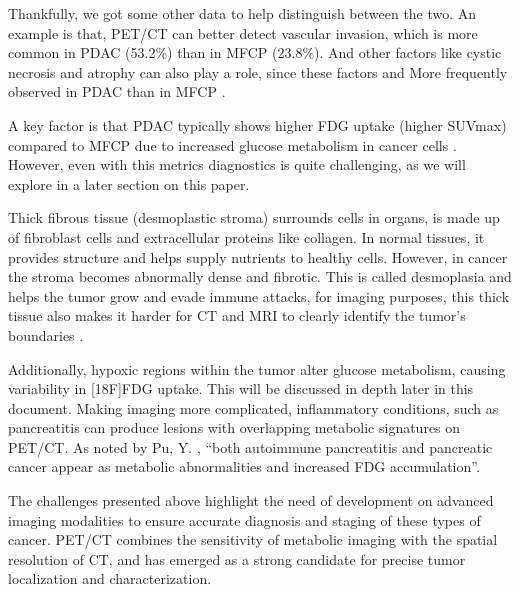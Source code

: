 Thankfully, we got some other data to help distinguish between the two. An example is that, PET/CT can better detect vascular invasion, which is more common in PDAC (53.2\%) than in MFCP (23.8\%). And other factors like cystic necrosis and atrophy can also play a role, since these factors and More frequently observed in PDAC than in MFCP \cite{arnone2020}. 

A key factor is that PDAC typically shows higher FDG uptake (higher SUVmax) compared to MFCP due to increased glucose metabolism in cancer cells \cite{arnone2020,Pu2021}. However, even with this metrics diagnostics is quite challenging, as we will explore in a later section on this paper.



Thick fibrous tissue (desmoplastic stroma) surrounds cells in organs, is made up of fibroblast cells and extracellular proteins like collagen. In normal tissues, it provides structure and helps supply nutrients to healthy cells. However, in cancer the stroma becomes abnormally dense and fibrotic. This is called desmoplasia and helps the tumor grow and evade immune attacks, for imaging purposes, this thick tissue also makes it harder for CT and MRI to clearly identify the tumor's boundaries \cite{NCCNGuidelines}.


Additionally, hypoxic regions within the tumor alter glucose metabolism, causing variability in [18F]FDG uptake. This will be discussed in depth later in this document. Making imaging more complicated, inflammatory conditions, such as pancreatitis can produce lesions with overlapping metabolic signatures on PET/CT. As noted by Pu, Y. \cite{Pu2021}, ``both autoimmune pancreatitis and pancreatic cancer appear as metabolic abnormalities and increased FDG accumulation''.



The challenges presented above highlight the need of development on advanced imaging modalities to ensure accurate diagnosis and staging of these types of cancer. PET/CT combines the sensitivity of metabolic imaging with the spatial resolution of CT, and has emerged as a strong candidate for precise tumor localization and characterization.


